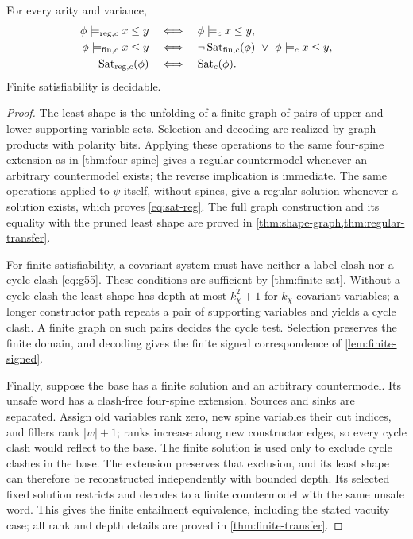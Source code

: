 \begin{proposition}[Transfer]\label{prop:transfer}
For every arity and variance,
\begin{align}
 \phi\models_{\mathrm{reg},c}x\le y
 &\quad\Longleftrightarrow\quad\phi\models_c x\le y,\label{eq:g7}\\
 \phi\models_{\mathrm{fin},c}x\le y
 &\quad\Longleftrightarrow\quad
 \neg\operatorname{Sat}_{\mathrm{fin},c}(\phi)\ \lor\ \phi\models_c x\le y,\label{eq:g8}\\
 \operatorname{Sat}_{\mathrm{reg},c}(\phi)
 &\quad\Longleftrightarrow\quad\operatorname{Sat}_c(\phi).\label{eq:sat-reg}
\end{align}
Finite satisfiability is decidable.
\end{proposition}

\begin{proof}
The least shape is the unfolding of a finite graph of pairs of upper
and lower supporting-variable sets. Selection and decoding are realized
by graph products with polarity bits. Applying these operations to the
same four-spine extension as in \cref{thm:four-spine} gives a regular
countermodel whenever an arbitrary countermodel exists; the reverse
implication is immediate. The same operations applied to $\psi$ itself, without
spines, give a regular solution whenever a solution exists, which proves
\eqref{eq:sat-reg}.
The full graph construction and its equality
with the pruned least shape are proved in \cref{thm:shape-graph,thm:regular-transfer}.

For finite satisfiability, a covariant system must have neither a label
clash nor a cycle clash \eqref{eq:g55}. These conditions are sufficient by
\cref{thm:finite-sat}. Without a cycle clash the least shape has depth at
most $k_\chi^2+1$ for $k_\chi$ covariant variables; a longer constructor
path repeats a pair of supporting variables and yields a cycle clash.
A finite graph on such pairs decides the cycle test. Selection preserves
the finite domain, and decoding gives the finite signed correspondence
of \cref{lem:finite-signed}.

Finally, suppose the base has a finite solution and an arbitrary
countermodel. Its unsafe word has a clash-free four-spine extension.
Sources and sinks are separated. Assign old variables rank zero, new
spine variables their cut indices, and fillers rank $|w|+1$; ranks increase
along new constructor edges, so every cycle clash would reflect to the
base. The finite solution is used only to exclude cycle clashes in the
base. The extension preserves that exclusion, and its least shape can
therefore be reconstructed independently with bounded depth. Its selected fixed solution restricts and decodes to a
finite countermodel with the same unsafe word. This gives the finite
entailment equivalence, including the stated vacuity case; all rank and
depth details are proved in \cref{thm:finite-transfer}.
\end{proof}

